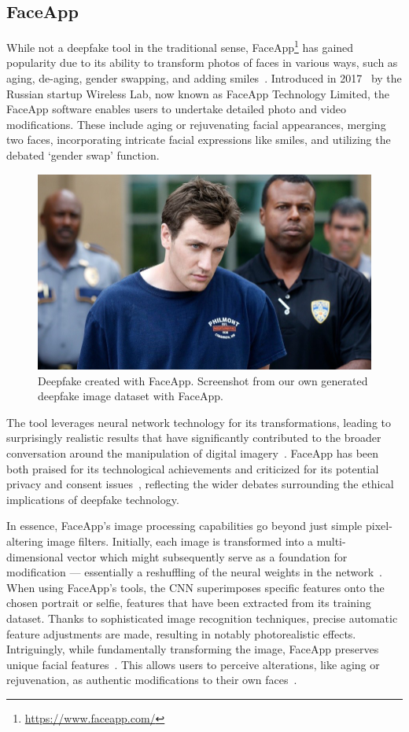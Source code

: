 \subsection{FaceApp}\label{sec:faceapp}
While not a deepfake tool in the traditional sense,
FaceApp\footnote{\url{https://www.faceapp.com/}} has gained popularity due
to its ability to transform photos of faces in various ways, such as aging,
de-aging, gender swapping, and adding smiles~\cite{wirth2023interface}.
Introduced in 2017~\cite{wirth2023interface} by the Russian startup Wireless Lab, now known
as FaceApp Technology Limited, the FaceApp software enables users to undertake
detailed photo and video modifications. These include aging or rejuvenating facial
appearances, merging two faces, incorporating intricate facial expressions like smiles,
and utilizing the debated `gender swap' function.

\begin{figure}[htpb]
	\centering
	\includegraphics[width=0.61\columnwidth]{figures/faceapp}
	\caption{Deepfake created with FaceApp. Screenshot from our own generated deepfake image
		dataset with FaceApp.}
\end{figure}

The tool leverages neural network technology for its transformations, leading to surprisingly
realistic results that have significantly contributed to the broader conversation
around the manipulation of digital imagery~\cite{faceapp}. FaceApp has
been both praised for its technological achievements and criticized for
its potential privacy and consent issues~\cite{warzel2019faceapp}, reflecting the wider debates
surrounding the ethical implications of deepfake technology.

In essence, FaceApp's image processing capabilities go beyond just simple pixel-altering
image filters. Initially, each image is transformed into a multi-dimensional vector which
might subsequently serve as a foundation for modification --- essentially a reshuffling
of the neural weights in the network~\cite{faceapp-article1}. When using FaceApp's tools,
the \ac{CNN} superimposes specific features onto the chosen portrait or selfie, features
that have been extracted from its training dataset. Thanks to sophisticated image recognition
techniques, precise automatic feature adjustments are made, resulting in notably photorealistic
effects. Intriguingly, while fundamentally transforming the image, FaceApp preserves
unique facial features~\cite{faceapp-medium}. This allows users to perceive alterations, like aging or
rejuvenation, as authentic modifications to their own faces~\cite{wirth2023interface,faceapp-article2}.

